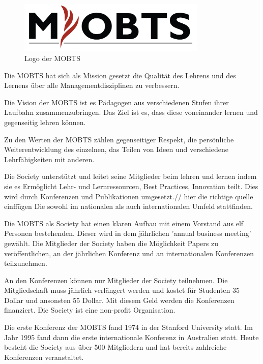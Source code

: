 \begin{figure}[h]
    \centering
    \includegraphics[width=0.8\textwidth]{img/mobtslogo.png}
    \caption[Logo: \ac{MOBTS}]{Logo der \ac{MOBTS}}
    \label{fig:LOGO_MOBTS}
\end{figure}

Die \ac{MOBTS} hat sich als Mission gesetzt die Qualität des Lehrens und des Lernens über alle Managementdisziplinen zu verbessern.\autocite{MOBTS.452021} 

Die Vision der \ac{MOBTS} ist es Pädagogen aus verschiedenen Stufen ihrer Laufbahn zusammenzubringen. Das Ziel ist es, dass diese voneinander lernen und gegenseitig lehren können.\autocite{MOBTS.452021} 

Zu den Werten der \ac{MOBTS} zählen gegenseitiger Respekt, die persönliche Weiterentwicklung des einzelnen, das Teilen von Ideen und verschiedene Lehrfähigkeiten mit anderen.\autocite{MOBTSExecutiveCommitee.432021} 

Die Society unterstützt und leitet seine Mitglieder beim lehren und lernen indem sie es Ermöglicht Lehr- und Lernressourcen, Best Practices, Innovation teilt. Dies wird durch Konferenzen und Publikationen umgesetzt.\autocite{MOBTS.452021}// hier die richtige quelle einffügen Die sowohl im nationalen als auch internationalen Umfeld stattfinden. 

Die \ac{MOBTS} als Society hat einen klaren Aufbau mit einem Vorstand aus elf Personen bestehenden. Dieser wird in dem jährlichen 'annual business meeting' gewählt. Die Mitglieder der Society haben die Möglichkeit Papers zu veröffentlichen, an der jährlichen Konferenz und an internationalen Konferenzen teilzunehmen.\autocite{MOBTS.452021} 

An den Konferenzen können nur Mitglieder der Society teilnehmen. Die Mitgliedschaft muss jährlich verlängert werden und kostet für Studenten 35 Dollar und ansonsten 55 Dollar.\autocite{MOBTS.432021e} Mit diesem Geld werden die Konferenzen finanziert. Die Society ist eine non-profit Organisation.  

Die erste Konferenz der \ac{MOBTS} fand 1974 in der Stanford University statt. Im Jahr 1995 fand dann die erste internationale Konferenz in Australien statt.\autocite{MOBTS.432021c} Heute besteht die Society aus über 500 Mitgliedern und hat bereits zahlreiche Konferenzen veranstaltet.\autocite[Vgl. Minute 13]{MOBTS.432021b}

